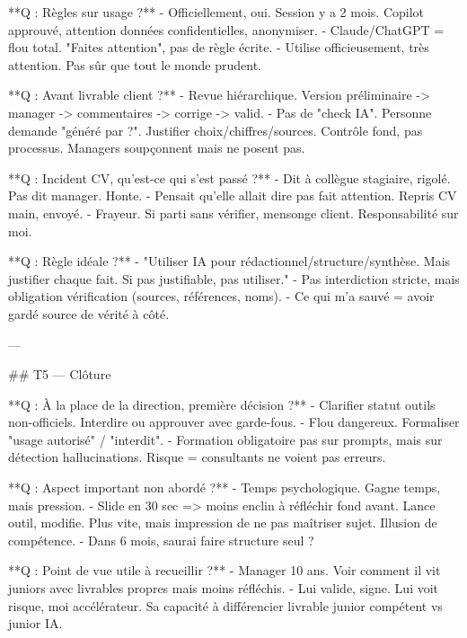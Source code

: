 **Q : Règles sur usage ?**
- Officiellement, oui. Session y a 2 mois. Copilot approuvé, attention données confidentielles, anonymiser.
- Claude/ChatGPT = flou total. "Faites attention", pas de règle écrite.
- Utilise officieusement, très attention. Pas sûr que tout le monde prudent.

**Q : Avant livrable client ?**
- Revue hiérarchique. Version préliminaire -> manager -> commentaires -> corrige -> valid.
- Pas de "check IA". Personne demande "généré par ?". Justifier choix/chiffres/sources. Contrôle fond, pas processus. Managers soupçonnent mais ne posent pas.

**Q : Incident CV, qu'est-ce qui s'est passé ?**
- Dit à collègue stagiaire, rigolé. Pas dit manager. Honte.
- Pensait qu'elle allait dire pas fait attention. Repris CV main, envoyé.
- Frayeur. Si parti sans vérifier, mensonge client. Responsabilité sur moi.

**Q : Règle idéale ?**
- "Utiliser IA pour rédactionnel/structure/synthèse. Mais justifier chaque fait. Si pas justifiable, pas utiliser."
- Pas interdiction stricte, mais obligation vérification (sources, références, noms).
- Ce qui m'a sauvé = avoir gardé source de vérité à côté.

---

## T5 — Clôture

**Q : À la place de la direction, première décision ?**
- Clarifier statut outils non-officiels. Interdire ou approuver avec garde-fous.
- Flou dangereux. Formaliser "usage autorisé" / "interdit".
- Formation obligatoire pas sur prompts, mais sur détection hallucinations. Risque = consultants ne voient pas erreurs.

**Q : Aspect important non abordé ?**
- Temps psychologique. Gagne temps, mais pression.
- Slide en 30 sec => moins enclin à réfléchir fond avant. Lance outil, modifie. Plus vite, mais impression de ne pas maîtriser sujet. Illusion de compétence.
- Dans 6 mois, saurai faire structure seul ?

**Q : Point de vue utile à recueillir ?**
- Manager 10 ans. Voir comment il vit juniors avec livrables propres mais moins réfléchis.
- Lui valide, signe. Lui voit risque, moi accélérateur. Sa capacité à différencier livrable junior compétent vs junior IA.
